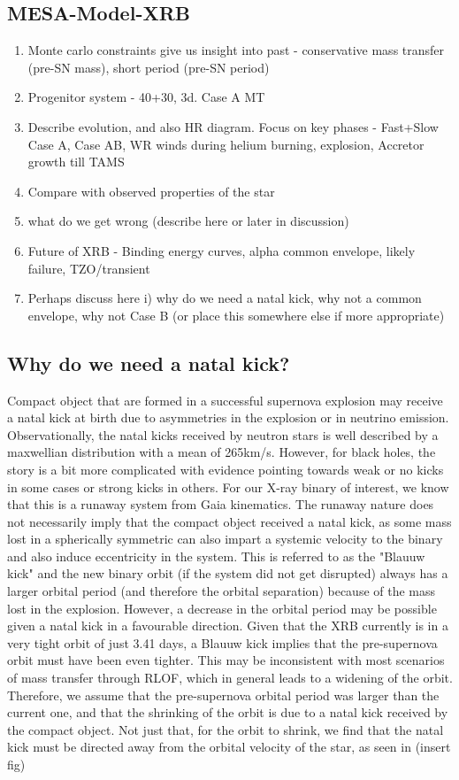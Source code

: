 \documentclass[linenumbers,trackchanges,twocolumn]{aastex701}
\begin{document}
\subsection{MESA-Model-XRB}

\begin{enumerate}
    \item Monte carlo constraints give us insight into past - conservative mass transfer (pre-SN mass), short period (pre-SN period)
    \item Progenitor system - 40+30, 3d. Case A MT
    \item Describe evolution, and also HR diagram. Focus on key phases - Fast+Slow Case A, Case AB, WR winds during helium burning, explosion, Accretor growth till TAMS
    \item Compare with observed properties of the star
    \item what do we get wrong (describe here or later in discussion)
    \item Future of XRB - Binding energy curves, alpha common envelope, likely failure, TZO/transient
    \item Perhaps discuss here i) why do we need a natal kick, why not a common envelope, why not Case B (or place this somewhere else if more appropriate)
\end{enumerate}

\subsection{Why do we need a natal kick?}

Compact object that are formed in a successful supernova explosion may receive a natal kick at birth due to asymmetries in the explosion or in neutrino emission. Observationally, the natal kicks received by neutron stars is well described by a maxwellian distribution with a mean of 265km/s. However, for black holes, the story is a bit more complicated with evidence pointing towards weak or no kicks in some cases or strong kicks in others. For our X-ray binary of interest, we know that this is a runaway system from Gaia kinematics. The runaway nature does not necessarily imply that the compact object received a natal kick, as some mass lost in a spherically symmetric can also impart a systemic velocity to the binary and also induce eccentricity in the system. This is referred to as the "Blauuw kick" and the new binary orbit (if the system did not get disrupted) always has a larger orbital period (and therefore the orbital separation) because of the mass lost in the explosion. However, a decrease in the orbital period may be possible given a natal kick in a favourable direction. Given that the XRB currently is in a very tight orbit of just 3.41 days, a Blauuw kick implies that the pre-supernova orbit must have been even tighter. This may be inconsistent with most scenarios of mass transfer through RLOF, which in general leads to a widening of the orbit. Therefore, we assume that the pre-supernova orbital period was larger than the current one, and that the shrinking of the orbit is due to a natal kick received by the compact object. Not just that, for the orbit to shrink, we find that the natal kick must be directed away from the orbital velocity of the star, as seen in (insert fig)
\end{document}
